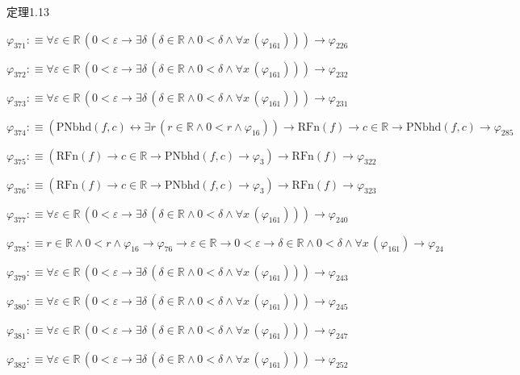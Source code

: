 \begin{fullproof}{定理1.13}
\begin{abbrevlist}
\item $\varphi_{371} :\equiv \forall \varepsilon \in \mathbb{R}\,(0 < \varepsilon \to \exists \delta\,(\delta \in \mathbb{R} \land 0 < \delta \land \forall x\,(\varphi_{161}))) \to \varphi_{226}$
\item $\varphi_{372} :\equiv \forall \varepsilon \in \mathbb{R}\,(0 < \varepsilon \to \exists \delta\,(\delta \in \mathbb{R} \land 0 < \delta \land \forall x\,(\varphi_{161}))) \to \varphi_{232}$
\item $\varphi_{373} :\equiv \forall \varepsilon \in \mathbb{R}\,(0 < \varepsilon \to \exists \delta\,(\delta \in \mathbb{R} \land 0 < \delta \land \forall x\,(\varphi_{161}))) \to \varphi_{231}$
\item $\varphi_{374} :\equiv (\mathrm{PNbhd}(f,c) \leftrightarrow \exists r\,(r \in \mathbb{R} \land 0 < r \land \varphi_{16})) \to \mathrm{RFn}(f) \to c \in \mathbb{R} \to \mathrm{PNbhd}(f,c) \to \varphi_{285}$
\item $\varphi_{375} :\equiv (\mathrm{RFn}(f) \to c \in \mathbb{R} \to \mathrm{PNbhd}(f,c) \to \varphi_{3}) \to \mathrm{RFn}(f) \to \varphi_{322}$
\item $\varphi_{376} :\equiv (\mathrm{RFn}(f) \to c \in \mathbb{R} \to \mathrm{PNbhd}(f,c) \to \varphi_{3}) \to \mathrm{RFn}(f) \to \varphi_{323}$
\item $\varphi_{377} :\equiv \forall \varepsilon \in \mathbb{R}\,(0 < \varepsilon \to \exists \delta\,(\delta \in \mathbb{R} \land 0 < \delta \land \forall x\,(\varphi_{161}))) \to \varphi_{240}$
\item $\varphi_{378} :\equiv r \in \mathbb{R} \land 0 < r \land \varphi_{16} \to \varphi_{76} \to \varepsilon \in \mathbb{R} \to 0 < \varepsilon \to \delta \in \mathbb{R} \land 0 < \delta \land \forall x\,(\varphi_{161}) \to \varphi_{24}$
\item $\varphi_{379} :\equiv \forall \varepsilon \in \mathbb{R}\,(0 < \varepsilon \to \exists \delta\,(\delta \in \mathbb{R} \land 0 < \delta \land \forall x\,(\varphi_{161}))) \to \varphi_{243}$
\item $\varphi_{380} :\equiv \forall \varepsilon \in \mathbb{R}\,(0 < \varepsilon \to \exists \delta\,(\delta \in \mathbb{R} \land 0 < \delta \land \forall x\,(\varphi_{161}))) \to \varphi_{245}$
\item $\varphi_{381} :\equiv \forall \varepsilon \in \mathbb{R}\,(0 < \varepsilon \to \exists \delta\,(\delta \in \mathbb{R} \land 0 < \delta \land \forall x\,(\varphi_{161}))) \to \varphi_{247}$
\item $\varphi_{382} :\equiv \forall \varepsilon \in \mathbb{R}\,(0 < \varepsilon \to \exists \delta\,(\delta \in \mathbb{R} \land 0 < \delta \land \forall x\,(\varphi_{161}))) \to \varphi_{252}$

\end{abbrevlist}
\end{fullproof}
